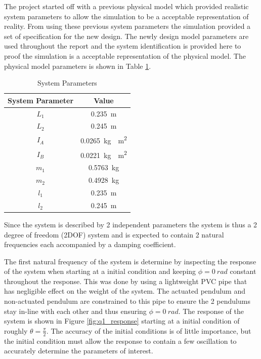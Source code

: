 The project started off with a previous physical model which provided realistic system parameters to allow the simulation to be a acceptable representation of reality. From using these previous system parameters the simulation provided a set of specification for the new design. The newly design model parameters are used throughout the report and the system identification is provided here to proof the simulation is a acceptable representation of the physical model. The physical model parameters is shown in Table \ref{table:system_param}.

		\begin{table}[]
	\centering
	\begin{tabular}{|c|c|}
		\hline
		System Parameter & Value \\
		\hline
		\hline
		$L_{1}$ & \SI{0.235}{m} \\
		\hline
		$L_{2}$ & \SI{0.245}{m} \\ 
		\hline
		$I_{A}$ & \SI{0.0265}{kg\cdot m^2}\\
		\hline
		$I_{B}$ & \SI{0.0221}{kg\cdot m^2}\\
		\hline
		$m_{1}$ & \SI{0.5763}{kg}\\
		\hline
		$m_{2}$ & \SI{0.4928}{kg} \\
		\hline
		$l_{1}$ & \SI{0.235}{m}\\
		\hline
		$l_{2}$ & \SI{0.245}{m}\\
		\hline
	\end{tabular}
	\caption{System Parameters}
	\label{table:system_param}
\end{table}


Since the system is described by 2 independent parameters the system is thus a 2 degree of freedom (2DOF) system and is expected to contain 2 natural frequencies each accompanied by a damping coefficient.

The first natural frequency of the system is determine by inspecting the response of the system when starting at a initial condition and keeping $\phi = \SI{0}{rad}$ constant throughout the response. This was done by using a lightweight PVC pipe that has negligible effect on the weight of the system. The actuated pendulum and non-actuated pendulum are constrained to this pipe to ensure the 2 pendulums stay in-line with each other and thus ensuring $\phi = \SI{0}{rad}$. The response of the system is shown in Figure \ref{fig:q1_response} starting at a initial condition of roughly $\theta = \frac{\pi}{2}$. The accuracy of the initial conditions is of little importance, but the initial condition must allow the response to contain a few oscillation to accurately determine the parameters of interest.\\

